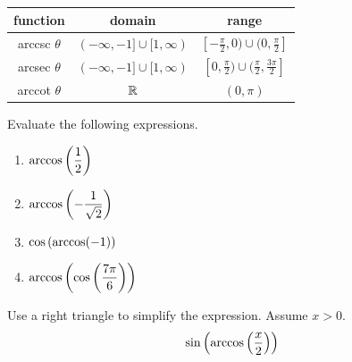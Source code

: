 \documentclass[12pt]{article}
\begin{document}
\begin{center}
\renewcommand{\arraystretch}{1.5}
\begin{tabular}{|c|c|c|}
\hline
\rowcolor[HTML]{EFEFEF} 
\textbf{function} & \textbf{domain} & \textbf{range} \\ \hline
 arccsc $\theta$ & $(-\infty,-1]\cup[1,\infty)$       & $[-\frac{\pi}{2},0)\cup(0,\frac{\pi}{2}]$     \\ \hline
 arcsec $\theta$ & $(-\infty,-1]\cup[1,\infty)$        & $[0,\frac{\pi}{2})\cup(\frac{\pi}{2},\frac{3\pi}{2}]$       \\ \hline
arccot $\theta$ &  $\mathbb{R}$      & $(0,\pi)$      \\ \hline
\end{tabular}
\end{center}

\Example Evaluate the following expressions.

\begin{enumerate}
	\item[\tc{1}] $\arccos\left(\displaystyle\frac{1}{2}\right)$
	
	\vspace{15mm}
	
	\item[\tc{2}] $\arccos\left(-\displaystyle\frac{1}{\sqrt{2}}\right)$
	
	\vspace{15mm}
	
	\item[\tc{3}] $\cos\left(\arccos(-1)\right)$
	
	\vspace{15mm}
	
	\item[\tc{4}] $\arccos\left(\cos\left(\displaystyle\frac{7\pi}{6}\right)\right)$
\end{enumerate}

\newpage

\Example Use a right triangle to simplify the expression. Assume $x>0$.
$$\sin\left(\arccos\left(\displaystyle\frac{x}{2}\right)\right)$$
\end{document}
